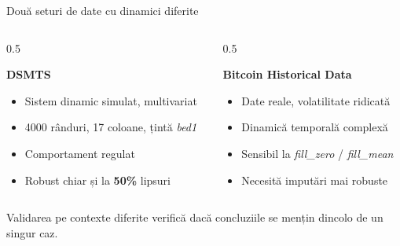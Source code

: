 \documentclass[aspectratio=169, 11pt]{beamer}
\begin{document}
\begin{frame}{Două seturi de date cu dinamici diferite}
  \begin{columns}[T]
    \begin{column}{0.5\textwidth}
      \begin{card}
        \textbf{\color{primary}DSMTS}\\[0.3em]
        \small
        \begin{itemize}
          \item Sistem dinamic simulat, multivariat
          \item 4000 rânduri, 17 coloane, țintă \textit{bed1}
          \item Comportament regulat
          \item Robust chiar și la \textbf{50\%} lipsuri
        \end{itemize}
      \end{card}
    \end{column}
    \begin{column}{0.5\textwidth}
      \begin{card}
        \textbf{\color{primary}Bitcoin Historical Data}\\[0.3em]
        \small
        \begin{itemize}
          \item Date reale, volatilitate ridicată
          \item Dinamică temporală complexă
          \item Sensibil la \textit{fill\_zero} / \textit{fill\_mean}
          \item Necesită imputări mai robuste
        \end{itemize}
      \end{card}
    \end{column}
  \end{columns}
  \vfill
  \centering\footnotesize\color{primary}
  Validarea pe contexte diferite verifică dacă concluziile se mențin dincolo de un singur caz.
\end{frame}
\end{document}
